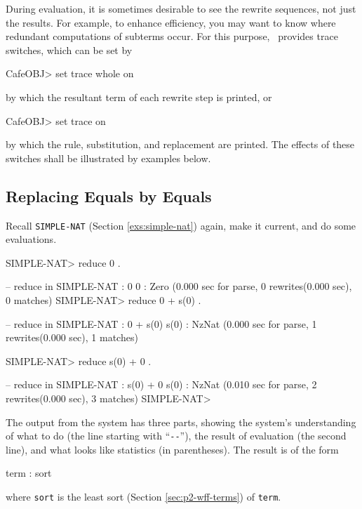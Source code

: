 \documentclass[a4paper]{memoir}
\begin{document}
During evaluation, it is sometimes desirable to see the rewrite sequences,
not just the results. For example, to enhance efficiency, you may want to
know where redundant computations of subterms occur. For this purpose,
\cafeobj~provides trace switches, which can be set by
\begin{vvtm}
\begin{ccode}
  CafeOBJ> set trace whole on
\end{ccode}
\end{vvtm}
by which the resultant term of each rewrite step is printed, or
\begin{vvtm}
\begin{ccode}
  CafeOBJ> set trace on
\end{ccode}
\end{vvtm}
by which the rule, substitution, and replacement are printed. The
effects of these switches shall be illustrated by examples
below.

\subsection{Replacing Equals by Equals}\label{sec:p2-eval-exs-1}

Recall \verb|SIMPLE-NAT| (Section \ref{exs:simple-nat}) again,
make it current, and do some evaluations.
\begin{vvtm}
\begin{ccode}
  SIMPLE-NAT> reduce 0 .

  -- reduce in SIMPLE-NAT : 0
  0 : Zero
  (0.000 sec for parse, 0 rewrites(0.000 sec), 0 matches)
  SIMPLE-NAT> reduce 0 + s(0) .

  -- reduce in SIMPLE-NAT : 0 + s(0)
  s(0) : NzNat
  (0.000 sec for parse, 1 rewrites(0.000 sec), 1 matches)

  SIMPLE-NAT> reduce s(0) + 0 .

  -- reduce in SIMPLE-NAT : s(0) + 0
  s(0) : NzNat
  (0.010 sec for parse, 2 rewrites(0.000 sec), 3 matches)
  SIMPLE-NAT>
\end{ccode}
\end{vvtm}
The output from the system has three parts, showing
the system's understanding of what to do (the line starting with
``\verb|--|''), the result of evaluation (the second line), and
what looks like statistics (in parentheses). The result is of the form
\begin{vvtm}
\begin{ccode}
  term : sort
\end{ccode}
\end{vvtm}
where \verb|sort| is the least sort (Section \ref{sec:p2-wff-terms})
of \verb|term|.
\end{document}
